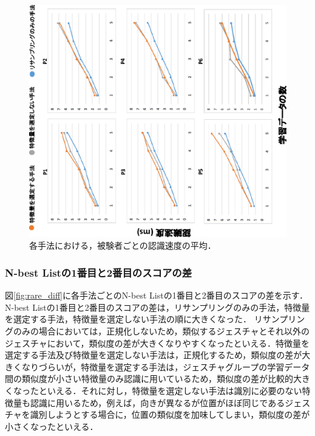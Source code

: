 \begin{figure}[!h]
\centering
\includegraphics[width=0.85\columnwidth,angle=-90]{img/pre_speed.eps}
\caption{各手法における，被験者ごとの認識速度の平均．}
\label{fig:rare_speed}
\end{figure}

\subsubsection{N-best Listの1番目と2番目のスコアの差}
図\ref{fig:rare_diff}に各手法ごとのN-best Listの1番目と2番目のスコアの差を示す．
N-best Listの1番目と2番目のスコアの差は，リサンプリングのみの手法，特徴量を選定する手法，特徴量を選定しない手法の順に大きくなった．
リサンプリングのみの場合においては，正規化しないため，類似するジェスチャとそれ以外のジェスチャにおいて，類似度の差が大きくなりやすくなったといえる．特徴量を選定する手法及び特徴量を選定しない手法は，正規化するため，類似度の差が大きくなりづらいが，特徴量を選定する手法は，ジェスチャグループの学習データ間の類似度が小さい特徴量のみ認識に用いているため，類似度の差が比較的大きくなったといえる．それに対し，特徴量を選定しない手法は識別に必要のない特徴量も認識に用いるため，例えば，向きが異なるが位置がほぼ同じであるジェスチャを識別しようとする場合に，位置の類似度を加味してしまい，類似度の差が小さくなったといえる．

